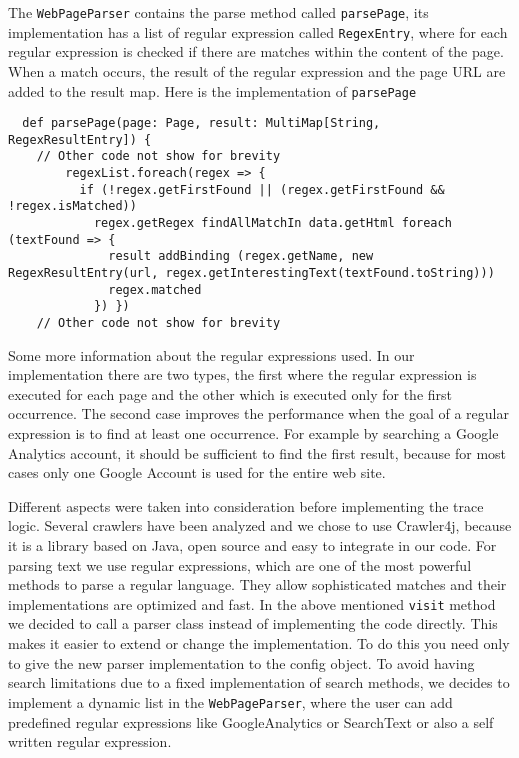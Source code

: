 \documentclass[
	a4paper,					10pt,							twoside,					openright,				notitlepage,			parskip=half,			]{scrreprt}
\begin{document}
The \verb|WebPageParser| contains the parse method called \verb|parsePage|, its implementation has a list of regular expression called \verb|RegexEntry|, 
where for each regular expression is checked if there are matches within the content of the page. When a match occurs, 
the result of the regular expression and the page \gls{URL} are added to the result map.
\newpage
Here is the implementation of \verb|parsePage|
\begin{lstlisting}
  def parsePage(page: Page, result: MultiMap[String, RegexResultEntry]) {
	// Other code not show for brevity
        regexList.foreach(regex => {
          if (!regex.getFirstFound || (regex.getFirstFound && !regex.isMatched))
            regex.getRegex findAllMatchIn data.getHtml foreach (textFound => {
              result addBinding (regex.getName, new RegexResultEntry(url, regex.getInterestingText(textFound.toString)))
              regex.matched
            }) })
	// Other code not show for brevity
\end{lstlisting}
Some more information about the regular expressions used. In our implementation there are two types, 
the first where the regular expression is executed for each page and the other which is executed only 
for the first occurrence. The second case improves the performance when the goal of a regular expression
is to find at least one occurrence. For example by searching a Google Analytics account,
it should be sufficient to find the first result, because for most cases only one Google Account 
is used for the entire web site.

Different aspects were taken into consideration before implementing the trace logic. 
Several crawlers have been analyzed and we chose to use Crawler4j, because it is a library based on Java,
open source and easy to integrate in our code. For parsing text we use regular expressions, 
which are one of the most powerful methods to parse a regular language. They allow sophisticated matches 
and their implementations are optimized and fast. In the above mentioned \verb|visit| method we decided
to call a parser class instead of implementing the code directly. This makes it easier to extend or change 
the implementation. To do this you need only to give the new parser implementation to the config object.
To avoid having search limitations due to a fixed implementation of search methods, we decides to implement 
a dynamic list in the \verb|WebPageParser|, where the user can add predefined regular expressions like GoogleAnalytics 
or SearchText or also a self written regular expression.
\end{document}
